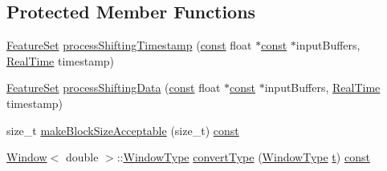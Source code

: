 \subsection*{Protected Member Functions}
\begin{DoxyCompactItemize}
\item 
\hyperlink{class_vamp_1_1_plugin_a448fb57dc245d47923ec9eeaf9856c5f}{Feature\+Set} \hyperlink{class_vamp_1_1_host_ext_1_1_plugin_input_domain_adapter_1_1_impl_ab6bf21ccfd3e662ac4e84eff07517e85}{process\+Shifting\+Timestamp} (\hyperlink{getopt1_8c_a2c212835823e3c54a8ab6d95c652660e}{const} float $\ast$\hyperlink{getopt1_8c_a2c212835823e3c54a8ab6d95c652660e}{const} $\ast$input\+Buffers, \hyperlink{struct_vamp_1_1_real_time}{Real\+Time} timestamp)
\item 
\hyperlink{class_vamp_1_1_plugin_a448fb57dc245d47923ec9eeaf9856c5f}{Feature\+Set} \hyperlink{class_vamp_1_1_host_ext_1_1_plugin_input_domain_adapter_1_1_impl_af1fe0c86c971d1d6a7cd35c5eb4ec88f}{process\+Shifting\+Data} (\hyperlink{getopt1_8c_a2c212835823e3c54a8ab6d95c652660e}{const} float $\ast$\hyperlink{getopt1_8c_a2c212835823e3c54a8ab6d95c652660e}{const} $\ast$input\+Buffers, \hyperlink{struct_vamp_1_1_real_time}{Real\+Time} timestamp)
\item 
size\+\_\+t \hyperlink{class_vamp_1_1_host_ext_1_1_plugin_input_domain_adapter_1_1_impl_a76073669d78c0681a3b3a9e71da86ae6}{make\+Block\+Size\+Acceptable} (size\+\_\+t) \hyperlink{getopt1_8c_a2c212835823e3c54a8ab6d95c652660e}{const} 
\item 
\hyperlink{class_window}{Window}$<$ double $>$\+::\hyperlink{class_vamp_1_1_host_ext_1_1_plugin_input_domain_adapter_a27e6a7c3f93f1618836792b588b767dc}{Window\+Type} \hyperlink{class_vamp_1_1_host_ext_1_1_plugin_input_domain_adapter_1_1_impl_aef39bb0fa1ea57e9d8995612ccff3e8b}{convert\+Type} (\hyperlink{class_vamp_1_1_host_ext_1_1_plugin_input_domain_adapter_a27e6a7c3f93f1618836792b588b767dc}{Window\+Type} \hyperlink{octave__test_8m_aaccc9105df5383111407fd5b41255e23}{t}) \hyperlink{getopt1_8c_a2c212835823e3c54a8ab6d95c652660e}{const} 
\end{DoxyCompactItemize}
